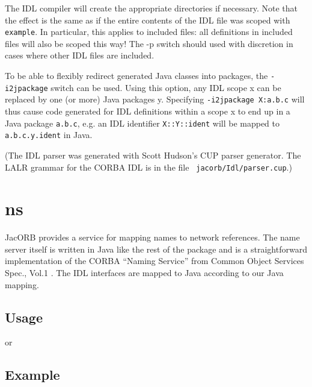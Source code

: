 \documentclass[12pt]{scrbook}
\begin{document}

The IDL compiler will create the appropriate directories if necessary.
Note that the effect is the same as if the entire contents of the IDL
file was scoped with {\tt example}. In particular, this applies to
included files: all definitions in included files will also be scoped
this way! The -p switch should used with discretion in cases where
other IDL files are included.

To be able to flexibly redirect generated Java classes into packages,
the {\tt -i2jpackage} switch can be used. Using this option, any IDL
scope x can be replaced by one (or more) Java packages y. Specifying
{\tt -i2jpackage X:a.b.c} will thus cause code generated for IDL
definitions within a scope x to end up in a Java package {\tt a.b.c},
e.g. an IDL identifier {\tt X::Y::ident} will be mapped to {\tt
  a.b.c.y.ident} in Java.

(The  IDL  parser  was   generated  with  Scott  Hudson's  CUP  parser
generator.  The  LALR grammar for  the CORBA IDL  is in the  file {\tt
jacorb/Idl/parser.cup}.)

\section{ns}

JacORB provides a service for mapping names to network references. The
name server itself is written in Java like the rest of the package and
is a  straightforward implementation  of the CORBA  ``Naming Service''
from  Common  Object Services  Spec.,  Vol.1  \cite{OMG1997}. The  IDL
interfaces are mapped to Java according to our Java mapping.

\subsection*{Usage}


or 


\subsection*{Example}

\end{document}
